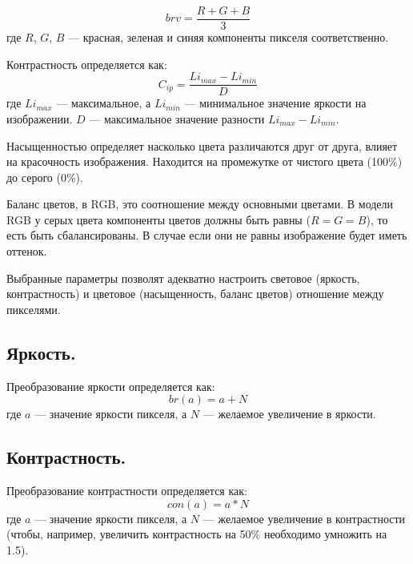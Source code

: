 \begin{equation}
	\label{br}
	brv = \frac{R + G + B}{3}
\end{equation}
где $R$, $G$, $B$ --- красная, зеленая и синяя компоненты пикселя соответственно. \cite{colorfaq}

Контрастность определяется как:
\begin{equation}
	\label{condef}
	C_{ip} = \frac{Li_{max} - Li_{min}}{D}
\end{equation}
где $Li_{max}$ --- максимальное, а $Li_{min}$ --- минимальное значение яркости на изображении. $D$ --- максимальное значение разности $Li_{max} - Li_{min}$. \cite{contrastdef}

Насыщенностью определяет насколько цвета различаются друг от друга, влияет на красочность изображения. Находится на промежутке от чистого цвета (100\%) до серого (0\%). \cite{satdef}

Баланс цветов, в RGB, это соотношение между основными цветами. В модели RGB у серых цвета компоненты цветов должны быть равны ($R = G = B$), то есть быть сбалансированы. В случае если они не равны изображение будет иметь оттенок.\cite{colorb}

Выбранные параметры позволят адекватно настроить световое (яркость, контрастность) и цветовое (насыщенность, баланс цветов) отношение между пикселями. 

\subsection{Яркость.}

Преобразование яркости определяется как:
\begin{equation}
	\label{brightness}
	br(a) = a + N
\end{equation}
где $a$ --- значение яркости пикселя, а $N$ --- желаемое увеличение в яркости. \cite{brk}


\subsection{Контрастность.}

Преобразование контрастности определяется как:
\begin{equation}
	\label{contrast}
	con(a) = a * N
\end{equation}
где $a$ --- значение яркости пикселя, а $N$ --- желаемое увеличение в контрастности (чтобы, например, увеличить контрастность на 50\% необходимо умножить на 1.5). \cite{brk}

